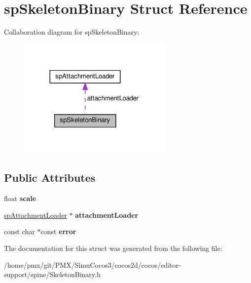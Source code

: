 \hypertarget{structspSkeletonBinary}{}\section{sp\+Skeleton\+Binary Struct Reference}
\label{structspSkeletonBinary}


Collaboration diagram for sp\+Skeleton\+Binary\+:
\nopagebreak
\begin{figure}[H]
\begin{center}
\leavevmode
\includegraphics[width=216pt]{structspSkeletonBinary__coll__graph}
\end{center}
\end{figure}
\subsection*{Public Attributes}
\begin{DoxyCompactItemize}
\item 
\mbox{\label{structspSkeletonBinary_a4ec133a15941e62e23654efc97c0feab}} 
float {\bfseries scale}
\item 
\mbox{\label{structspSkeletonBinary_a8226c6170a8ee6a287796ce9203254e4}} 
\hyperlink{structspAttachmentLoader}{sp\+Attachment\+Loader} $\ast$ {\bfseries attachment\+Loader}
\item 
\mbox{\label{structspSkeletonBinary_a57b10778dc1159b5e069a61a3f676a74}} 
const char $\ast$const {\bfseries error}
\end{DoxyCompactItemize}


The documentation for this struct was generated from the following file\+:\begin{DoxyCompactItemize}
\item 
/home/pmx/git/\+P\+M\+X/\+Simu\+Cocos3/cocos2d/cocos/editor-\/support/spine/Skeleton\+Binary.\+h\end{DoxyCompactItemize}
